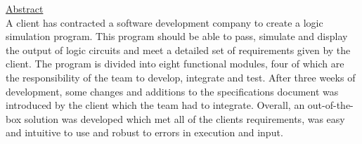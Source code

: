 \documentclass{article}					%
\begin{document}
\begin{titlepage}
\begin{flushleft}
\vspace{1.5 cm}
\underline{Abstract}\\					%
A client has contracted a software development company to create a logic simulation program. This program should be able to pass, simulate and display the output of logic circuits and meet a detailed set of requirements given by the client. The program is divided into eight functional modules, four of which are the responsibility of the team to develop, integrate and test. After three weeks of development, some changes and additions to the specifications document was introduced by the client which the team had to integrate. Overall, an out-of-the-box solution was developed which met all of the clients requirements, was easy and intuitive to use and robust to errors in execution and input.

\vspace*{\fill}

\end{flushleft}
\end{titlepage}							%

\end{document}
